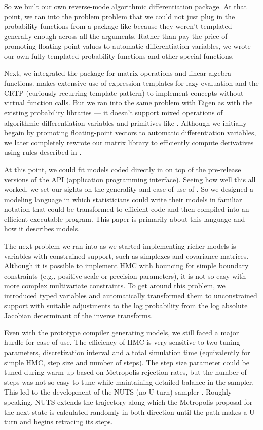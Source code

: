 \documentclass[article]{jss}
\begin{document}
So we built our own reverse-mode algorithmic differentiation package.
At that point, we ran into the problem problem that we could not just
plug in the probability functions from a package like  because
they weren't templated generally enough across all the arguments.
Rather than pay the price of promoting floating point values to
automatic differentiation variables, we wrote our own fully templated
probability functions and other special functions.

Next, we integrated the  package  for matrix
operations and linear algebra functions.   makes extensive use of
expression templates for lazy evaluation and the CRTP (curiously
recurring template pattern) to implement concepts without virtual
function calls.  But we ran into the same problem with Eigen as with
the existing probability libraries --- it doesn't support mixed
operations of algorithmic differentiation variables and primitives
like .  Although we initially begain by promoting
floating-point vectors to automatic differentiation variables, we
later completely rewrote our matrix library to efficiently compute
derivatives using rules described in \citep{Giles:??,book:??}.

At this point, we could fit models coded directly in  on
top of the pre-release versions of the  API
(application programming interface).  Seeing how well this all worked,
we set our sights on the generality and ease of use of
.  So we designed a modeling language in which
statisticians could write their models in familiar notation that could
be transformed to efficient  code and then compiled into
an efficient executable program.  This paper is primarily about this
language and how it describes models.
 
The next problem we ran into as we started implementing richer models
is variables with constrained support, such as simplexes and
covariance matrices.  Although it is possible to implement HMC with
bouncing for simple boundary constraints (e.g., positive scale or
precision parameters), it is not so easy with more complex
multivariate constraints.  To get around this problem, we introduced
typed variables and automatically transformed them to unconstrained
support with suitable adjustments to the log probability from the log
absolute Jacobian determinant of the inverse transforms.

Even with the prototype compiler generating models, we still faced a
major hurdle for ease of use. The efficiency of HMC is very sensitive
to two tuning parameters, discretization interval and a total
simulation time (equivalently for simple HMC, step size and number of
steps).  The step size parameter could be tuned during warm-up based
on Metropolis rejection rates, but the number of steps was not so easy
to tune while maintaining detailed balance in the sampler.  This led
to the development of the NUTS (no U-turn) sampler
\citep{Hoffman-Gelman:2012}.  Roughly speaking, NUTS extends the
trajectory along which the Metropolis proposal for the next state is
calculated randomly in both direction until the path makes a U-turn
and begins retracing its steps.
\end{document}
